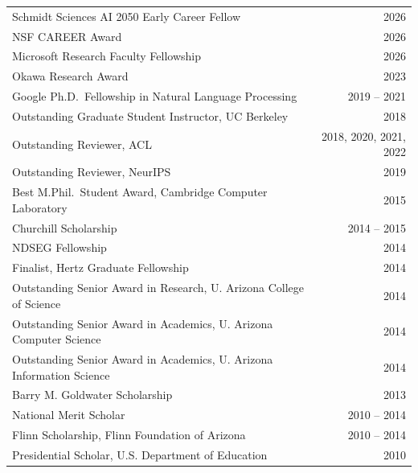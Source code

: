 \vspace{6pt}
\begin{longtable}{@{\hspace*{-3pt}}lr}
    Schmidt Sciences AI 2050 Early Career Fellow & 2026 \\
    NSF CAREER Award & 2026 \\
    Microsoft Research Faculty Fellowship & 2026 \\
    Okawa Research Award & 2023 \\
    Google Ph.D.\ Fellowship in Natural Language Processing & 2019 -- 2021 \\
    Outstanding Graduate Student Instructor, UC Berkeley & 2018 \\
    Outstanding Reviewer, ACL & 2018, 2020, 2021, 2022 \\
    Outstanding Reviewer, NeurIPS & 2019 \\
    Best M.Phil.\ Student Award, Cambridge Computer Laboratory & 2015 \\
    Churchill Scholarship & 2014 -- 2015 \\
    NDSEG Fellowship & 2014 \\
    Finalist, Hertz Graduate Fellowship & 2014 \\
    Outstanding Senior Award in Research, U. Arizona College of Science & 2014 \\
    Outstanding Senior Award in Academics, U. Arizona Computer Science & 2014 \\
    Outstanding Senior Award in Academics, U. Arizona Information Science & 2014 \\
    Barry M. Goldwater Scholarship & 2013 \\
    National Merit Scholar & 2010 -- 2014 \\
    Flinn Scholarship, Flinn Foundation of Arizona & 2010 -- 2014 \\
    Presidential Scholar, U.S. Department of Education & 2010 \\
\end{longtable}

